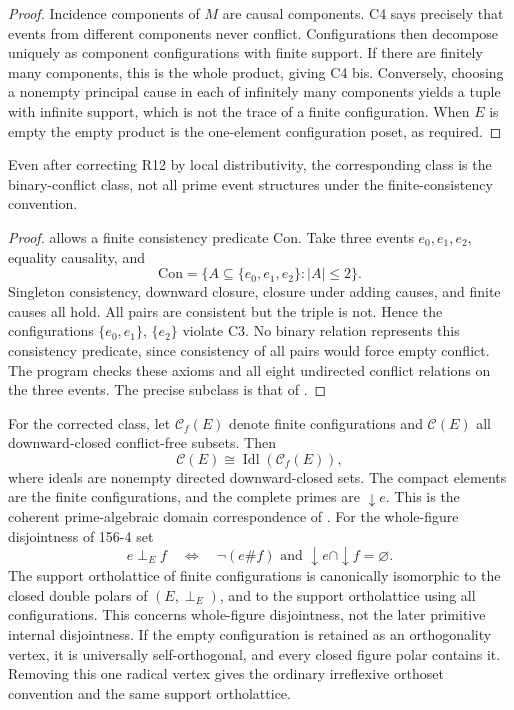 \begin{proof}
Incidence components of \(M\) are causal components. C4
says precisely that events from different components
never conflict. Configurations then decompose uniquely
as component configurations with finite support.
If there are finitely many components, this is the
whole product, giving C4 bis. Conversely, choosing a
nonempty principal cause in each of infinitely many
components yields a tuple with infinite support, which
is not the trace of a finite configuration. When \(E\)
is empty the empty product is the one-element
configuration poset, as required.
\end{proof}

\begin{counterexample}\label{SA21-BM-binary}
Even after correcting R12 by local distributivity, the
corresponding class is the binary-conflict class, not all
prime event structures under the finite-consistency convention.
\end{counterexample}

\begin{proof}
\citet[Definition 1.3.4, pp.~335--336]{Winskel1987} allows
a finite consistency predicate \(\mathrm{Con}\).
Take three events \(e_0,e_1,e_2\), equality causality, and
\[
 \mathrm{Con}=\{A\subseteq\{e_0,e_1,e_2\}:|A|\leq2\}.
\]
Singleton consistency, downward closure, closure under
adding causes, and finite causes all hold. All pairs
are consistent but the triple is not. Hence the
configurations \(\{e_0,e_1\}\), \(\{e_2\}\) violate C3.
No binary relation represents this consistency
predicate, since consistency of all pairs would force
empty conflict. The program checks these axioms and
all eight undirected conflict relations on the three
events. The precise subclass is that of
\citet[\S3.4.6, p.~378]{Winskel1987}.
\end{proof}

\begin{proposition}\label{SA21-BM-domain}
For the corrected class, let \(\mathcal C_f(E)\) denote finite
configurations and \(\mathcal C(E)\) all downward-closed
conflict-free subsets. Then
\[
 \mathcal C(E)\cong\operatorname{Idl}(\mathcal C_f(E)),
\]
where ideals are nonempty directed downward-closed sets.
The compact elements are the finite configurations,
and the complete primes are \(\downarrow e\).
This is the coherent prime-algebraic domain correspondence
of \citet[Theorems 8--9, Definitions 17--18, p.~102]{NPW1981}.
For the whole-figure disjointness of 156-4 set
\[
 e\perp_E f\quad\Longleftrightarrow\quad
 \neg(e\#f)\text{ and }\downarrow e\cap\downarrow f=\varnothing.
\]
The support ortholattice of finite configurations is
canonically isomorphic to the closed double polars
of \((E,\perp_E)\), and to the support ortholattice
using all configurations. This concerns whole-figure
disjointness, not the later primitive internal disjointness.
If the empty configuration is retained as an orthogonality
vertex, it is universally self-orthogonal, and every closed
figure polar contains it. Removing this one radical vertex
gives the ordinary irreflexive orthoset convention and the
same support ortholattice.
\end{proposition}

